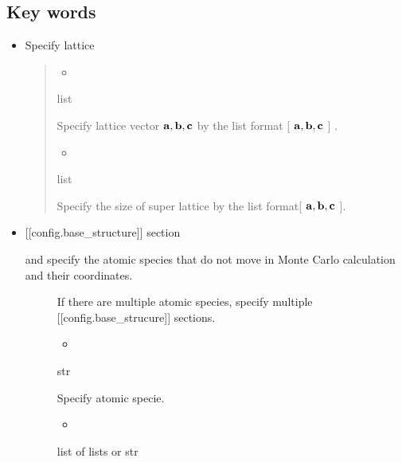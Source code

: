 \documentclass[letterpaper,10pt,english]{sphinxmanual}
\begin{document}
\subsection{Key words}
\label{\detokenize{file_specification/parameter_config:key-words}}\begin{itemize}
\item {} 
Specify lattice
\begin{quote}
\begin{itemize}
\item {} 

\end{itemize}

 list

Specify lattice vector \(\bf{a}, \bf{b}, \bf{c}\) by
the list format {[} \(\bf{a}, \bf{b}, \bf{c}\) {]} .
\begin{itemize}
\item {} 

\end{itemize}

 list

Specify the size of super lattice by the list format{[} \(\bf{a}, \bf{b}, \bf{c}\) {]}.
\end{quote}

\item {} 
{[}{[}config.base\_structure{]}{]} section
\begin{description}
\item[{ and  specify the atomic species that do not move in Monte Carlo calculation and their coordinates.}] \leavevmode
If there are multiple atomic species, specify multiple {[}{[}config.base\_strucure{]}{]} sections.
\begin{itemize}
\item {} 

\end{itemize}

 str

  Specify atomic specie.
\begin{itemize}
\item {} 

\end{itemize}

 list of lists or str


\end{description}
\end{itemize}
\end{document}
